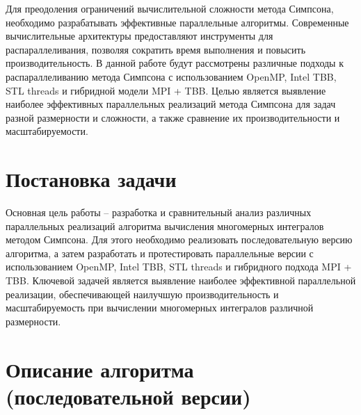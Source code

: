 \documentclass[12pt]{article}
\begin{document}
Для преодоления ограничений вычислительной сложности метода Симпсона, необходимо разрабатывать эффективные параллельные алгоритмы. Современные вычислительные архитектуры предоставляют инструменты для распараллеливания, позволяя сократить время выполнения и повысить производительность. В данной работе будут рассмотрены различные подходы к распараллеливанию метода Симпсона с использованием OpenMP, Intel TBB, STL threads и гибридной модели MPI + TBB. Целью является выявление наиболее эффективных параллельных реализаций метода Симпсона для задач разной размерности и сложности, а также сравнение их производительности и масштабируемости.

\section{Постановка задачи}

\hspace*{1.35em}Основная цель работы – разработка и сравнительный анализ различных параллельных реализаций алгоритма вычисления многомерных интегралов методом Симпсона. Для этого необходимо реализовать последовательную версию алгоритма, а затем разработать и протестировать параллельные версии с использованием OpenMP, Intel TBB, STL threads и гибридного подхода MPI + TBB. Ключевой задачей является выявление наиболее эффективной параллельной реализации, обеспечивающей наилучшую производительность и масштабируемость при вычислении многомерных интегралов различной размерности.

\section{Описание алгоритма (последовательной версии)}
\end{document}
